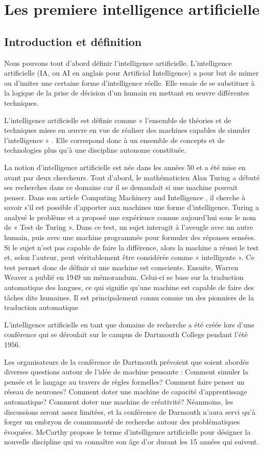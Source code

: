 \section{Les premiere intelligence artificielle}

\subsection{Introduction et définition}

Nous pouvons tout d’abord définir l’intelligence artificielle.
L'intelligence artificielle (IA, ou AI en anglais pour Artificial Intelligence) a pour but de mimer ou d’imiter une certaine forme d’intelligence réelle. Elle essaie de se substituer à la logique de la prise de décision d’un humain en mettant en œuvre différentes techniques.

L'intelligence artificielle est définie comme « l'ensemble de théories et de techniques mises en œuvre en vue de réaliser des machines capables de simuler l'intelligence » . 
Elle correspond donc à un ensemble de concepts et de technologies plus qu'à une discipline autonome constituée.

La notion d’intelligence artificielle est née dans les années 50 et a été mise en avant par deux chercheurs.
Tout d’abord, le mathématicien Alan Turing a débuté ses recherches dans ce domaine car il se demandait si une machine pouvait penser.
Dans son article Computing Machinery and Intelligence , il cherche à savoir s’il est possible d’apporter aux machines une forme d'intelligence. 
Turing a analysé le problème et a proposé une expérience connue aujourd’hui sous le nom de « Test de Turing ». 
Dans ce test, un sujet interagit à l'aveugle avec un autre humain, puis avec une machine programmée pour formuler des réponses sensées. Si le sujet n'est pas capable de faire la différence, alors la machine a réussi le test et, selon l'auteur, peut véritablement être considérée comme « intelligente ».
Ce test permet donc de définir si une machine est consciente.
Ensuite, Warren Weaver a publié en 1949 un mémorandum. Celui-ci se base sur la traduction automatique des langues, ce qui signifie qu’une machine est capable de faire des tâches dite humaines.
Il est principalement connu comme un des pionniers de la traduction automatique

L’intelligence artificielle en tant que  domaine de recherche a été créée lors d’une conférence qui se déroulait sur le campus de Dartmouth College pendant l'été 1956.

Les organisateurs de la conférence de Dartmouth prévoient que soient abordés diverses questions
autour de l'idée de machine pensante :
Comment simuler la pensée et le langage au travers de règles formelles?
Comment faire penser un réseau de neurones?
Comment doter une machine de capacité d'apprentissage automatique?
Comment doter une machine de créativité?
Néanmoins, les discussions seront assez limitées, et la conférence de Darmouth n'aura servi qu'à forger un
embryon de communauté de recherche autour des problématiques évoquées.
McCarthy propose le terme d'intelligence artificielle pour désigner la nouvelle discipline qui va
connaître son âge d'or durant les 15 années qui suivent.


